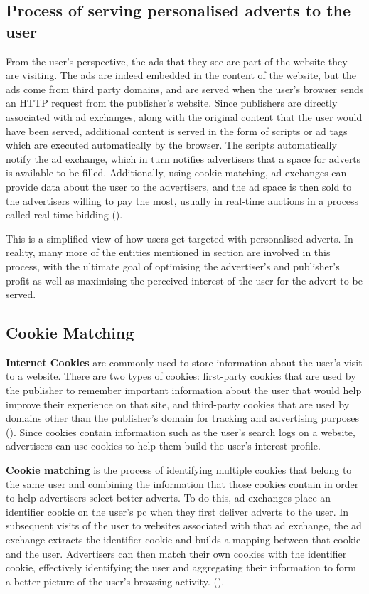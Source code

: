 \documentclass{l4proj}
\begin{document}
\subsection{Process of serving personalised adverts to the user}
From the user's perspective, the ads that they see are part of the website they are visiting. The ads are indeed embedded in the content of the website, but the ads come from third party domains, and are served when the user's browser sends an HTTP request from the publisher's website. Since publishers are directly associated with ad exchanges, along with the original content that the user would have been served, additional content is served in the form of scripts or ad tags which are executed automatically by the browser. The scripts automatically notify the ad exchange, which in turn notifies advertisers that a space for adverts is available to be filled. Additionally, using cookie matching, ad exchanges can provide data about the user to the advertisers, and the ad space is then sold to the advertisers willing to pay the most, usually in real-time auctions in a process called real-time bidding (\cite{Estrada-Jimenez2017}).

This is a simplified view of how users get targeted with personalised adverts. In reality, many more of the entities mentioned in section  are involved in this process, with the ultimate goal of optimising the advertiser's and publisher's profit as well as maximising the perceived interest of the user for the advert to be served.

\subsection{Cookie Matching}
\textbf{Internet Cookies} are commonly used to store information about the user's visit to a website. There are two types of cookies: first-party cookies that are used by the publisher to remember important information about the user that would help improve their experience on that site, and third-party cookies that are used by domains other than the publisher's domain for tracking and advertising purposes (\cite{Estrada-Jimenez2017}). Since cookies contain information such as the user's search logs on a website, advertisers can use cookies to help them build the user's interest profile. 

\textbf{Cookie matching} is the process of identifying multiple cookies that belong to the same user and combining the information that those cookies contain in order to help advertisers select better adverts. To do this, ad exchanges place an identifier cookie on the user's pc when they first deliver adverts to the user. In subsequent visits of the user to websites associated with that ad exchange, the ad exchange extracts the identifier cookie and builds a mapping between that cookie and the user. Advertisers can then match their own cookies with the identifier cookie, effectively identifying the user and aggregating their information to form a better picture of the user's browsing activity. (\cite{Grandmont1985}).
\end{document}
